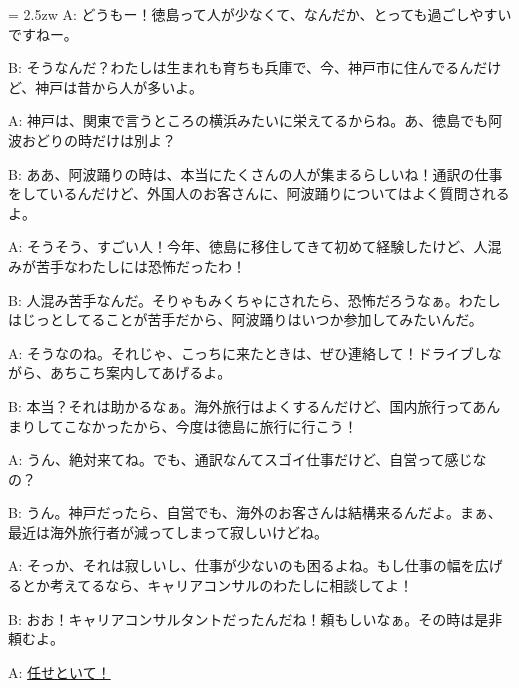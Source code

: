 \documentclass[11pt]{amsart}
\title{}
\author{}
\newenvironment{hangall}[1]{\hangindent = 2.5zw\everypar{\hangindent = 2.5zw}}{}
\begin{document}
\maketitle
\begin{hangall}{}%
A: どうもー！徳島って人が少なくて、なんだか、とっても過ごしやすいですねー。

B: そうなんだ？わたしは生まれも育ちも兵庫で、今、神戸市に住んでるんだけど、神戸は昔から人が多いよ。

A: 神戸は、関東で言うところの横浜みたいに栄えてるからね。あ、徳島でも阿波おどりの時だけは別よ？

B: ああ、阿波踊りの時は、本当にたくさんの人が集まるらしいね！通訳の仕事をしているんだけど、外国人のお客さんに、阿波踊りについてはよく質問されるよ。

A: そうそう、すごい人！今年、徳島に移住してきて初めて経験したけど、人混みが苦手なわたしには恐怖だったわ！

B: 人混み苦手なんだ。そりゃもみくちゃにされたら、恐怖だろうなぁ。わたしはじっとしてることが苦手だから、阿波踊りはいつか参加してみたいんだ。

A: そうなのね。それじゃ、こっちに来たときは、ぜひ連絡して！ドライブしながら、あちこち案内してあげるよ。

B: 本当？それは助かるなぁ。海外旅行はよくするんだけど、国内旅行ってあんまりしてこなかったから、今度は徳島に旅行に行こう！

A: うん、絶対来てね。でも、通訳なんてスゴイ仕事だけど、自営って感じなの？

B: うん。神戸だったら、自営でも、海外のお客さんは結構来るんだよ。まぁ、最近は海外旅行者が減ってしまって寂しいけどね。

A: そっか、それは寂しいし、仕事が少ないのも困るよね。もし仕事の幅を広げるとか考えてるなら、キャリアコンサルのわたしに相談してよ！

B: おお！キャリアコンサルタントだったんだね！頼もしいなぁ。その時は是非頼むよ。

A: \ul{任せといて！}\end{hangall}
\end{document}
